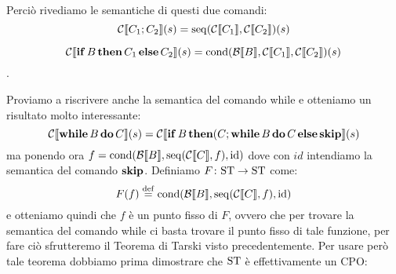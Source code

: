 Perciò rivediamo le semantiche di questi due comandi:
$$ \mathcal{C} \llbracket C_1 ; C_2 \rrbracket (s) = \mathrm{seq}(\mathcal{C} \llbracket C_1 \rrbracket, \mathcal{C} \llbracket C_2 \rrbracket)(s)$$

$$\mathcal{C} \llbracket \mathop{\textup{\textbf{if}}} B \mathop{\textup{\textbf{then}}} C_1 \mathop{\textup{\textbf{else}}} C_2 \rrbracket (s) = \mathrm{cond}(\mathcal{B} \llbracket B \rrbracket, \mathcal{C} \llbracket C_1 \rrbracket, \mathcal{C} \llbracket C_2 \rrbracket)(s)$$.

Proviamo a riscrivere anche la semantica del comando while e otteniamo un risultato molto interessante:
$$ \mathcal{C} \llbracket \mathop{\textup{\textbf{while}}} B \mathop{\textup{\textbf{do}}} C \rrbracket (s) = \mathcal{C} \llbracket \mathop{\textup{\textbf{if}}} B \mathop{\textup{\textbf{then}}} (C ; \mathop{\textup{\textbf{while}}} B \mathop{\textup{\textbf{do}}} C \mathop{\textup{\textbf{else}}} \mathop{\textup{\textbf{skip}}} \rrbracket (s)$$
ma ponendo ora $f = \mathrm{cond}(\mathcal{B} \llbracket B \rrbracket, \mathrm{seq}(\mathcal{C} \llbracket C \rrbracket, f), \mathrm{id})$ dove con $id$ intendiamo la semantica del comando $\mathop{\textup{\textbf{skip}}}$.
Definiamo $\mathord{F}\colon\mathrm{ST}\to\mathrm{ST}$ come:
\[
F(f) \defeq \mathrm{cond}(\calB \llbracket B \rrbracket, \mathrm{seq}(\calC \llbracket C \rrbracket, f), \mathrm{id})
\]
e otteniamo quindi che $f$ è un punto fisso di $F$, ovvero che per trovare la semantica del comando while ci basta trovare il punto fisso di tale funzione, per fare ciò sfrutteremo il Teorema di Tarski visto precedentemente. Per usare però tale teorema dobbiamo prima dimostrare che $\mathrm{ST}$ è effettivamente un CPO:

